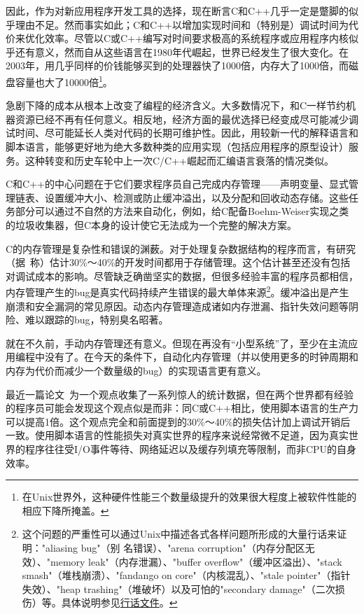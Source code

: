 \documentclass[12pt,oneside]{ctexbook}
\begin{document}
\begin{common-format}
因此，作为对新应用程序开发工具的选择，现在断言C和C++几乎一定是蹩脚的似乎理由不足。然而事实如此；C和C++以增加实现时间和（特别是）调试时间为代价来优化效率。尽管以C或C++编写对时间要求极高的系统程序或应用程序内核似乎还有意义，然而自从这些语言在1980年代崛起，世界已经发生了很大变化。在2003年，用几乎同样的价钱能够买到的处理器快了1000倍，内存大了1000倍，而磁盘容量也大了10000倍\footnote{在Unix世界外，这种硬件性能三个数量级提升的效果很大程度上被软件性能的相应下降所掩盖。}。

急剧下降的成本从根本上改变了编程的经济含义。大多数情况下，和C一样节约机器资源已经不再有任何意义。相反地，经济方面的最优选择已经变成尽可能减少调试时间、尽可能延长人类对代码的长期可维护性。因此，用较新一代的解释语言和脚本语言，能够更好地为绝大多数种类的应用实现（包括应用程序的原型设计）服务。这种转变和历史车轮中上一次C/C++崛起而汇编语言衰落的情况类似。

C和C++的中心问题在于它们要求程序员自己完成内存管理——声明变量、显式管理链表、设置缓冲大小、检测或防止缓冲溢出，以及分配和回收动态存储。这些任务部分可以通过不自然的方法来自动化，例如，给C配备Boehm-Weiser实现之类的垃圾收集器，但C本身的设计使它无法成为一个完整的解决方案。

C的内存管理是复杂性和错误的渊薮。对于处理复杂数据结构的程序而言，有研究（据~\cite{Boehm}称）估计30\%{}～40\%{}的开发时间都用于存储管理。这个估计甚至还没有包括对调试成本的影响。尽管缺乏确凿坚实的数据，但很多经验丰富的程序员都相信，内存管理产生的bug是真实代码持续产生错误的最大单体来源\footnote{这个问题的严重性可以通过Unix中描述各式各样问题所形成的大量行话来证明："aliasing bug"（别
名错误）、"arena corruption"（内存分配区无效）、"memory leak"（内存泄漏）、"buffer overflow"（缓冲区溢出）、"stack smash"（堆栈崩溃）、"fandango on core"（内核混乱）、"stale pointer"（指针失效）、"heap trashing"（堆破坏）以及可怕的"secondary damage"（二次损伤）等。具体说明参见\href{http://www.catb.org/~esr/jargon}{行话文件}。}。缓冲溢出是产生崩溃和安全漏洞的常见原因。动态内存管理造成诸如内存泄漏、指针失效问题等阴险、难以跟踪的bug，特别臭名昭著。

就在不久前，手动内存管理还有意义。但现在再没有“小型系统”了，至少在主流应用编程中没有了。在今天的条件下，自动化内存管理（并以使用更多的时钟周期和内存为代价而减少一个数量级的bug）的实现语言更有意义。

最近一篇论文~\cite{Prechelt}为一个观点收集了一系列惊人的统计数据，但在两个世界都有经验的程序员可能会发现这个观点似是而非：同C或C++相比，使用脚本语言的生产力可以提高1倍。这个观点完全和前面提到的30\%{}～40\%{}的损失估计加上调试开销后一致。使用脚本语言的性能损失对真实世界的程序来说经常微不足道，因为真实世界的程序往往受I/O事件等待、网络延迟以及缓存列填充等限制，而非CPU的自身效率。


\end{common-format}
\end{document}
